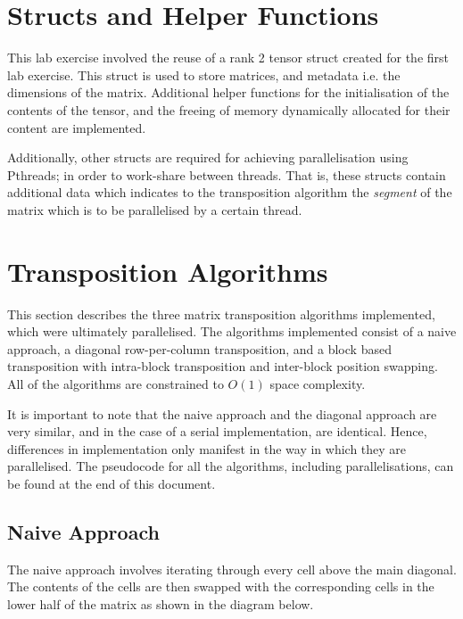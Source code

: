 \documentclass[journal,10pt]{IEEEtran}
\begin{document}

\section {Structs and Helper Functions}

This lab exercise involved the reuse of a rank 2 tensor struct created for the first lab exercise. This struct is used to store matrices, and metadata i.e. the dimensions of the matrix. Additional helper functions for the initialisation of the contents of the tensor, and the freeing of memory dynamically allocated for their content are implemented.

Additionally, other structs are required for achieving parallelisation using Pthreads; in order to work-share between threads. That is, these structs contain additional data which indicates to the transposition algorithm the \textit{segment} of the matrix which is to be parallelised by a certain thread.





\section{Transposition Algorithms}

This section describes the three matrix transposition algorithms implemented, which were ultimately parallelised. The algorithms implemented consist of a naive approach, a diagonal row-per-column transposition, and a block based transposition with intra-block transposition and inter-block position swapping. All of the algorithms are constrained to $O(1)$ space complexity.

It is important to note that the naive approach and the diagonal approach are very similar, and in the case of a serial implementation, are identical. Hence, differences in implementation only manifest in the way in which they are parallelised. The pseudocode for all the algorithms, including parallelisations, can be found at the end of this document.

\subsection{Naive Approach}
The naive approach involves iterating through every cell above the main diagonal. The contents of the cells are then swapped with the corresponding cells in the lower half of the matrix as shown in the diagram below.
\end{document}
